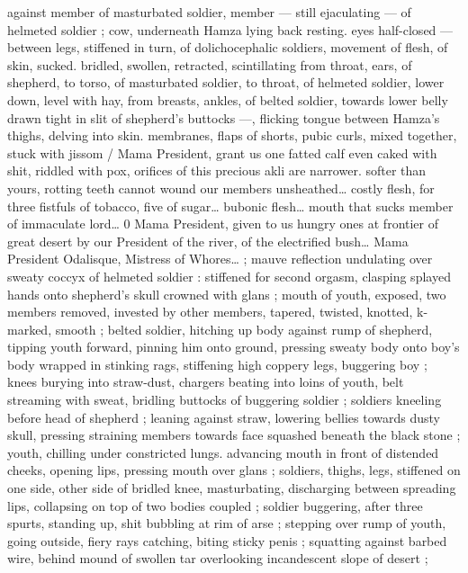 {against member of masturbated soldier, member --- still ejaculating 
--- of helmeted soldier ; cow, underneath Hamza lying back resting. 
eyes half-closed --- between legs, stiffened in turn, of 
dolichocephalic soldiers, movement of flesh, of skin, sucked. 
bridled, swollen, retracted, scintillating from throat, ears, of 
shepherd, to torso, of masturbated soldier, to throat, of helmeted 
soldier, lower down, level with hay, from breasts, ankles, of belted 
soldier, towards lower belly drawn tight in slit of shepherd's buttocks 
---, flicking tongue between Hamza's thighs, delving into skin. 
membranes, flaps of shorts, pubic curls, mixed together, stuck with 
jissom {\slash} {\td} {\gl} Mama President, grant us one fatted calf{\td} even caked 
with shit, riddled with pox, orifices of this precious akli are narrower. 
softer than yours, rotting teeth cannot wound our members 
unsheathed{\ldots} costly flesh, for three fistfuls of tobacco, five of 
sugar{\ldots} bubonic flesh{\ldots} mouth that sucks member of immaculate 
lord{\ldots} 0 Mama President, given to us hungry ones at frontier of great 
desert by our President of the river, of the electrified bush{\ldots} Mama 
President Odalisque, Mistress of Whores{\ldots}{\gr} ; mauve reflection 
undulating over sweaty coccyx of helmeted soldier : stiffened for 
second orgasm, clasping splayed hands onto shepherd's skull 
crowned with glans ; mouth of youth, exposed, two members 
removed, invested by other members, tapered, twisted, knotted, 
k-marked, smooth ; belted soldier, hitching up body against rump 
of shepherd, tipping youth forward, pinning him onto ground, 
pressing sweaty body onto boy's body wrapped in stinking rags, 
stiffening high coppery legs, buggering boy ; knees burying into 
straw-dust, chargers beating into loins of youth, belt streaming with 
sweat, bridling buttocks of buggering soldier ; soldiers kneeling 
before head of shepherd ; leaning against straw, lowering bellies 
towards dusty skull, pressing straining members towards face 
squashed beneath the black stone ; youth, chilling under constricted 
lungs. advancing mouth in front of distended cheeks, opening lips, 
pressing mouth over glans ; soldiers, thighs, legs, stiffened on one 
side, other side of bridled knee, masturbating, discharging between 
spreading lips, collapsing on top of two bodies coupled ; soldier 
buggering, after three spurts, standing up, shit bubbling at rim of 
arse ; stepping over rump of youth, going outside, fiery rays 
catching, biting sticky penis ; squatting against barbed wire, behind 
mound of swollen tar overlooking incandescent slope of desert ; 
}
